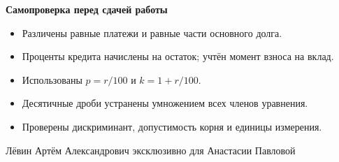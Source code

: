 \documentclass[a4paper,11pt]{article}
\begin{document}
\vspace{4mm}
\textcolor{darkaccent}{\textbf{Самопроверка перед сдачей работы}}
\begin{itemize}[itemsep=0pt,topsep=2pt]
\item Различены равные платежи и равные части основного долга.
\item Проценты кредита начислены на остаток; учтён момент взноса на вклад.
\item Использованы $p=r/100$ и $k=1+r/100$.
\item Десятичные дроби устранены умножением всех членов уравнения.
\item Проверены дискриминант, допустимость корня и единицы измерения.
\end{itemize}

\vfill
\begin{center}
{\small\color{softgray}Лёвин Артём Александрович эксклюзивно для Анастасии Павловой}
\end{center}
\end{document}
